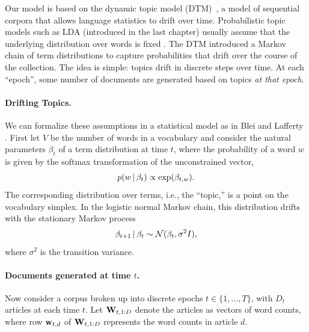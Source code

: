Our model is based on the dynamic topic model (DTM)~\cite{blei:2006},
a model of sequential corpora that allows language statistics to drift
over time.  Probabilistic topic models such as LDA (introduced in the
last chapter) usually assume that the underlying distribution over
words is fixed \cite{blei:2003,deerwester:1990,hofman:1999}. The DTM
introduced a Markov chain of term distributions to capture
probabilities that drift over the course of the collection.  The idea
is simple: topics drift in discrete steps over time.  At each
``epoch'', some number of documents are generated based on topics \emph{at that epoch}.

\paragraph{Drifting Topics.} We can formalize these assumptions in a
statistical model as in Blei and Lafferty \cite{blei:2006}.  First let
$V$ be the number of words in a vocabulary and consider the natural
parameters $\beta_t$ of a term distribution at time $t$, where the
probability of a word $w$ is given by the softmax transformation of
the unconstrained vector,
\begin{equation}
  \label{eq:softmax}
  p(w \, | \, \beta_{t}) \propto \exp(\beta_{t,w}).
\end{equation}
The corresponding distribution over terms, i.e., the ``topic,'' is a
point on the vocabulary simplex.  In the logistic normal Markov chain,
this distribution drifts with the stationary Markov process
\begin{equation}
  \label{eq:logistic-normal}
  \beta_{t+1} \, | \, \beta_t \sim \mathcal{N}(\beta_{t}, \sigma^2 I),
\end{equation}
where $\sigma^2$ is the transition variance. 

\paragraph{Documents generated at time $t$.} Now consider a corpus
broken up into discrete epochs $t \in \{ 1, \ldots, T \}$, with $D_t$
articles at each time $t$.  Let $\textbf{W}_{t,1:D}$ denote the articles as
vectors of word counts, where row $\textbf{w}_{t,d}$ of $\textbf{W}_{t, 1:D}$
represents the word counts in article $d$.

